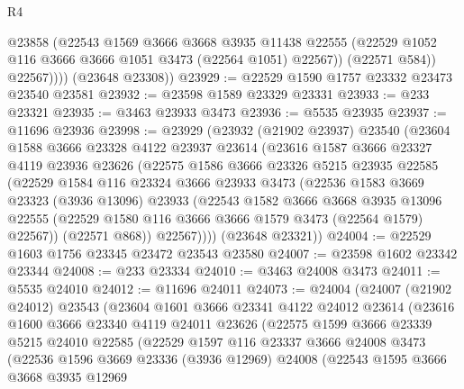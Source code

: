 \begin{lexlean}{R4}
\begin{coremodule}
                @23858
                (@22543
                  @1569
                  @3666
                  @3668
                  @3935
                  @11438
                  @22555
                  (@22529 @1052 @116 @3666 @3666 @1051 @3473 (@22564 @1051) @22567))
                (@22571 @584))
              @22567))))
      (@23648 @23308))
@23929 := @22529 @1590 @1757 @23332 @23473 @23540 @23581
@23932 := @23598 @1589 @23329 @23331
@23933 := @233 @23321
@23935 := @3463 @23933 @3473
@23936 := @5535 @23935
@23937 := @11696 @23936
@23998 := @23929
    (@23932
      (@21902 @23937)
      @23540
      (@23604
        @1588
        @3666
        @23328
        @4122
        @23937
        @23614
        (@23616
          @1587
          @3666
          @23327
          @4119
          @23936
          @23626
          (@22575
            @1586
            @3666
            @23326
            @5215
            @23935
            @22585
            (@22529
              @1584
              @116
              @23324
              @3666
              @23933
              @3473
              (@22536
                @1583
                @3669
                @23323
                (@3936 @13096)
                @23933
                (@22543
                  @1582
                  @3666
                  @3668
                  @3935
                  @13096
                  @22555
                  (@22529 @1580 @116 @3666 @3666 @1579 @3473 (@22564 @1579) @22567))
                (@22571 @868))
              @22567))))
      (@23648 @23321))
@24004 := @22529 @1603 @1756 @23345 @23472 @23543 @23580
@24007 := @23598 @1602 @23342 @23344
@24008 := @233 @23334
@24010 := @3463 @24008 @3473
@24011 := @5535 @24010
@24012 := @11696 @24011
@24073 := @24004
    (@24007
      (@21902 @24012)
      @23543
      (@23604
        @1601
        @3666
        @23341
        @4122
        @24012
        @23614
        (@23616
          @1600
          @3666
          @23340
          @4119
          @24011
          @23626
          (@22575
            @1599
            @3666
            @23339
            @5215
            @24010
            @22585
            (@22529
              @1597
              @116
              @23337
              @3666
              @24008
              @3473
              (@22536
                @1596
                @3669
                @23336
                (@3936 @12969)
                @24008
                (@22543
                  @1595
                  @3666
                  @3668
                  @3935
                  @12969

\end{coremodule}
\end{lexlean}
